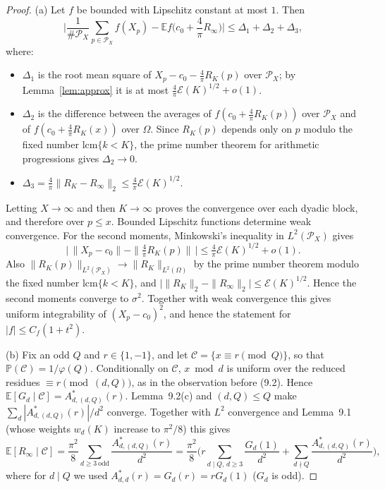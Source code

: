 \documentclass[11pt]{amsart}
\theoremstyle{remark}
\newcommand{\E}{\mathbb{E}}
\newcommand{\Prob}{\mathbb{P}}
\begin{document}
\begin{proof}
(a) Let $f$ be bounded with Lipschitz constant at most $1$. Then
\[
\Big|\frac1{\#\mathcal P_X}\sum_{p\in\mathcal P_X}f(X_p)-\E f\Big(c_0+\frac4\pi R_\infty\Big)\Big|\le\Delta_1+\Delta_2+\Delta_3,
\]
where:
\begin{itemize}
\item $\Delta_1$ is the root mean square of $X_p-c_0-\frac4\pi R_K(p)$ over $\mathcal P_X$; by Lemma~\ref{lem:approx} it is at most $\frac4\pi\mathcal E(K)^{1/2}+o(1)$.
\item $\Delta_2$ is the difference between the averages of $f(c_0+\frac4\pi R_K(p))$ over $\mathcal P_X$ and of $f(c_0+\frac4\pi R_K(x))$ over $\Omega$. Since $R_K(p)$ depends only on $p$ modulo the fixed number $\mathrm{lcm}\{k<K\}$, the prime number theorem for arithmetic progressions gives $\Delta_2\to0$.
\item $\Delta_3=\frac4\pi\|R_K-R_\infty\|_2\le\frac4\pi\mathcal E(K)^{1/2}$.
\end{itemize}
Letting $X\to\infty$ and then $K\to\infty$ proves the convergence over each dyadic block, and therefore over $p\le x$. Bounded Lipschitz functions determine weak convergence. For the second moments, Minkowski's inequality in $L^2(\mathcal P_X)$ gives
\[
\big|\,\|X_p-c_0\|-\|\tfrac4\pi R_K(p)\|\,\big|\le\tfrac4\pi\mathcal E(K)^{1/2}+o(1).
\]
Also $\|R_K(p)\|_{L^2(\mathcal P_X)}\to\|R_K\|_{L^2(\Omega)}$ by the prime number theorem modulo the fixed number $\mathrm{lcm}\{k<K\}$, and $\big|\|R_K\|_2-\|R_\infty\|_2\big|\le\mathcal E(K)^{1/2}$. Hence the second moments converge to $\sigma^2$. Together with weak convergence this gives uniform integrability of $(X_p-c_0)^2$, and hence the statement for $|f|\le C_f(1+t^2)$.

(b) Fix an odd $Q$ and $r\in\{1,-1\}$, and let $\mathcal C=\{x\equiv r\pmod Q\}$, so that $\Prob(\mathcal C)=1/\varphi(Q)$. Conditionally on $\mathcal C$, $x\bmod d$ is uniform over the reduced residues $\equiv r\pmod{(d,Q)}$, as in the observation before (9.2). Hence $\E[G_d\mid\mathcal C]=A^*_{d,(d,Q)}(r)$. Lemma~9.2(c) and $(d,Q)\le Q$ make $\sum_d|A^*_{d,(d,Q)}(r)|/d^2$ converge. Together with $L^2$ convergence and Lemma~9.1 (whose weights $w_d(K)$ increase to $\pi^2/8$) this gives
\begin{equation}\label{eq:condmean}
\E[R_\infty\mid\mathcal C]=\frac{\pi^2}8\sum_{d\ge3\ \mathrm{odd}}\frac{A^*_{d,(d,Q)}(r)}{d^2}=\frac{\pi^2}8\Big(r\sum_{d\mid Q,\,d\ge3}\frac{G_d(1)}{d^2}+\sum_{d\nmid Q}\frac{A^*_{d,(d,Q)}(r)}{d^2}\Big),
\end{equation}
where for $d\mid Q$ we used $A^*_{d,d}(r)=G_d(r)=rG_d(1)$ ($G_d$ is odd).


\end{proof}
\end{document}
